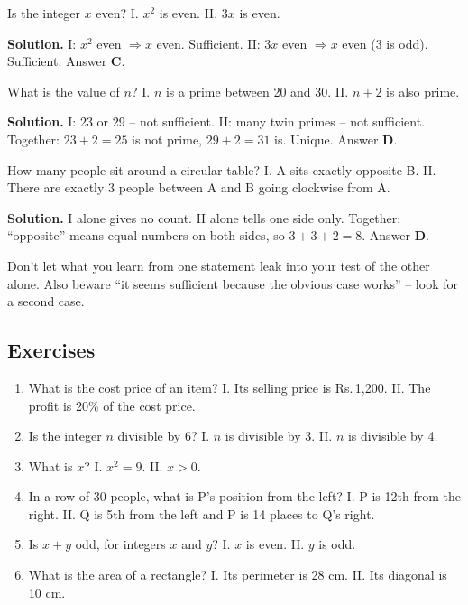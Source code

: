 \documentclass[11pt,a4paper,openany]{report}
\newenvironment{exercises}{\subsection*{Exercises \thechapter}\begin{enumerate}[label=\textbf{\thechapter.\arabic*},leftmargin=3.2em]}{\end{enumerate}}
\newcommand{\Rs}{Rs.\,}
\begin{document}
\begin{example}
Is the integer $x$ even? I. $x^2$ is even. II. $3x$ is even.

\textbf{Solution.} I: $x^2$ even $\Rightarrow x$ even. Sufficient. II: $3x$ even $\Rightarrow x$ even (3 is odd). Sufficient. Answer \textbf{C}.
\end{example}

\begin{example}
What is the value of $n$? I. $n$ is a prime between 20 and 30. II. $n+2$ is also prime.

\textbf{Solution.} I: 23 or 29 -- not sufficient. II: many twin primes -- not sufficient. Together: $23+2=25$ is not prime, $29+2=31$ is. Unique. Answer \textbf{D}.
\end{example}

\begin{example}
How many people sit around a circular table? I. A sits exactly opposite B. II. There are exactly 3 people between A and B going clockwise from A.

\textbf{Solution.} I alone gives no count. II alone tells one side only. Together: ``opposite'' means equal numbers on both sides, so $3+3+2=8$. Answer \textbf{D}.
\end{example}

\begin{trap}
Don't let what you learn from one statement leak into your test of the other alone. Also beware ``it seems sufficient because the obvious case works'' -- look for a second case.
\end{trap}

\begin{exercises}
\item What is the cost price of an item? I. Its selling price is \Rs1,200. II. The profit is 20\% of the cost price.
\item Is the integer $n$ divisible by 6? I. $n$ is divisible by 3. II. $n$ is divisible by 4.
\item What is $x$? I. $x^2=9$. II. $x>0$.
\item In a row of 30 people, what is P's position from the left? I. P is 12th from the right. II. Q is 5th from the left and P is 14 places to Q's right.
\item Is $x+y$ odd, for integers $x$ and $y$? I. $x$ is even. II. $y$ is odd.
\item What is the area of a rectangle? I. Its perimeter is 28 cm. II. Its diagonal is 10 cm.
\end{exercises}
\end{document}
